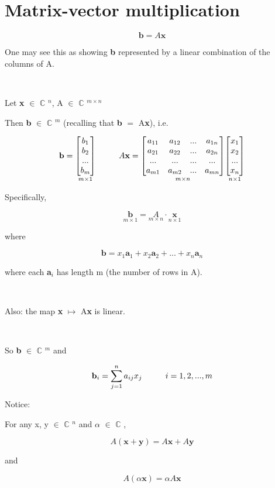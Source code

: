 \documentclass[12pt]{article}
\newcommand{\mt}[1]{\ensuremath{#1}}
\newcommand\bsc[2][\DefaultOpt]{%
  \def\DefaultOpt{#2}%
  \section[#1]{#2}%
}
\newcommand{\bc}{\mt{\mathbb{C}} }       %
\newcommand{\afa}{\mt{\alpha} }
\newcommand{\mem}{\mt{\in} }
\newcommand{\lba}{ \mt{\longmapsto} }     %
\newcommand{\eql}{\mt{=} }
\newcommand{\uw}[2]{#1\mt{_{#2}}}
\newcommand{\uf}[2]{#1\mt{^{#2}}}
\newcommand{\eqn}[1]{\[#1\]}
\newcommand\tab[1][1cm]{\hspace*{#1}}
\newcommand{\mxc}[5]{ %
\underset{#5 \times 1}{
  \begin{bmatrix}
     #1 \\
     #2 \\
     #3 \\
     #4
  \end{bmatrix}
  }
}
\begin{document}
\bsc{Matrix-vector multiplication} {

\eqn{\textbf{b} = A\textbf{x}}

One may see this as showing \textbf{b} represented by a linear combination of the columns of A.

\

Let \textbf{x} \mem \uf{\bc}{n}, A \mem \uf{\bc}{m\times n}

Then \textbf{b} \mem \uf{\bc}{m} (recalling that \textbf{b} \eql A\textbf{x}), i.e.

\begin{displaymath}
  \textbf{b} = \mxc{b_1}{b_2}{...}{b_m}{m}
  \tab{}
  A\textbf{x} = \underset{m \times n}{
\begin{bmatrix}
    a_{11} & a_{12} & ... & a_{1n} \\
    a_{21} & a_{22} & ... & a_{2n} \\
    ... & ... & ... & ... \\
    a_{m1} & a_{m2} & ... & a_{mn} 
  \end{bmatrix}
}
\mxc{x_1}{x_2}{...}{x_n}{n}
\end{displaymath}

Specifically,

\begin{displaymath}
  \underset{m\times 1}{\textbf{b}} = \underset{m \times n}{A} \cdot \underset{n\times 1}{\textbf{x}}
\end{displaymath}

where

\eqn{\textbf{b} = x_1 \textbf{a}_1 + x_2 \textbf{a}_2 + ... + x_n \textbf{a}_n}

where each \uw{\textbf{a}}{i} has length m (the number of rows in A).

\

Also: the map \textbf{x} \lba A\textbf{x} is linear.

\

So \textbf{b} \mem \uf{\bc}{m} and 

\eqn{\textbf{b}_i = \sum_{j=1}^n a_{ij} x_{j} \tab{} i = 1, 2, ..., m}

Notice:

For any x, y \mem \uf{\bc}{n} and \afa \mem \bc,

\begin{displaymath}
  A(\textbf{x} + \textbf{y}) = A\textbf{x} + A\textbf{y}
\end{displaymath}

and

\begin{displaymath}
  A(\alpha \textbf{x}) = \alpha A\textbf{x}
\end{displaymath}


}
\end{document}
